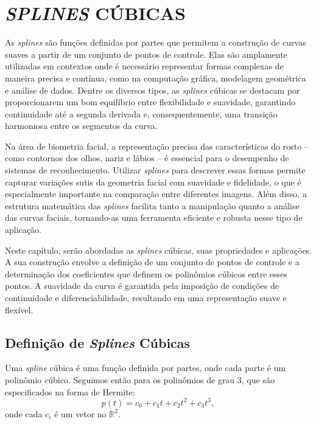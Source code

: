 \chapter{\textit{SPLINES} CÚBICAS} \label{cha:splines}

As \textit{splines} são funções definidas por partes que permitem a construção de curvas suaves a partir de um conjunto de pontos de controle. Elas são amplamente utilizadas em contextos onde é necessário representar formas complexas de maneira precisa e contínua, como na computação gráfica, modelagem geométrica e análise de dados. Dentre os diversos tipos, as \textit{splines} cúbicas se destacam por proporcionarem um bom equilíbrio entre flexibilidade e suavidade, garantindo continuidade até a segunda derivada e, consequentemente, uma transição harmoniosa entre os segmentos da curva.

Na área de biometria facial, a representação precisa das características do rosto -- como contornos dos olhos, nariz e lábios -- é essencial para o desempenho de sistemas de reconhecimento. Utilizar \textit{splines} para descrever essas formas permite capturar variações sutis da geometria facial com suavidade e fidelidade, o que é especialmente importante na comparação entre diferentes imagens. Além disso, a estrutura matemática das \textit{splines} facilita tanto a manipulação quanto a análise das curvas faciais, tornando-as uma ferramenta eficiente e robusta nesse tipo de aplicação.

Neste capítulo, serão abordadas as \textit{splines} cúbicas, suas propriedades e aplicações. A sua construção envolve a definição de um conjunto de pontos de controle e a determinação dos coeficientes que definem os polinômios cúbicos entre esses pontos. A suavidade da curva é garantida pela imposição de condições de continuidade e diferenciabilidade, resultando em uma representação suave e flexível.

\section{Definição de \textit{Splines} Cúbicas}
\label{sec:definicao-splines-cubicas}
Uma \textit{spline} cúbica é uma função definida por partes, onde cada parte é um polinômio cúbico. Seguimos então para os polinômios de grau 3, que são especificados na forma de Hermite:
\begin{equation}
    p(t) = c_0 + c_1t + c_2t^2 + c_3t^3,
\end{equation}
onde cada $c_i$ é um vetor no $\mathbb{R}^2$.

